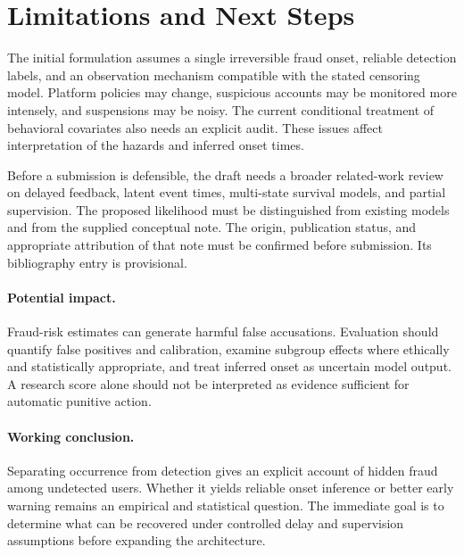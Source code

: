\section{Limitations and Next Steps}
The initial formulation assumes a single irreversible fraud onset, reliable
detection labels, and an observation mechanism compatible with the stated
censoring model. Platform policies may change, suspicious accounts may be
monitored more intensely, and suspensions may be noisy. The current
conditional treatment of behavioral covariates also needs an explicit audit.
These issues affect interpretation of the hazards and inferred onset times.

Before a submission is defensible, the draft needs a broader related-work
review on delayed feedback, latent event times, multi-state survival models,
and partial supervision. The proposed likelihood must be distinguished from
existing models and from the supplied conceptual note. The origin,
publication status, and appropriate attribution of that note must be
confirmed before submission. Its bibliography entry is provisional.

\paragraph{Potential impact.}
Fraud-risk estimates can generate harmful false accusations. Evaluation
should quantify false positives and calibration, examine subgroup effects
where ethically and statistically appropriate, and treat inferred onset as
uncertain model output. A research score alone should not be interpreted as
evidence sufficient for automatic punitive action.

\paragraph{Working conclusion.}
Separating occurrence from detection gives an explicit account of hidden
fraud among undetected users. Whether it yields reliable onset inference or
better early warning remains an empirical and statistical question. The
immediate goal is to determine what can be recovered under controlled delay
and supervision assumptions before expanding the architecture.
